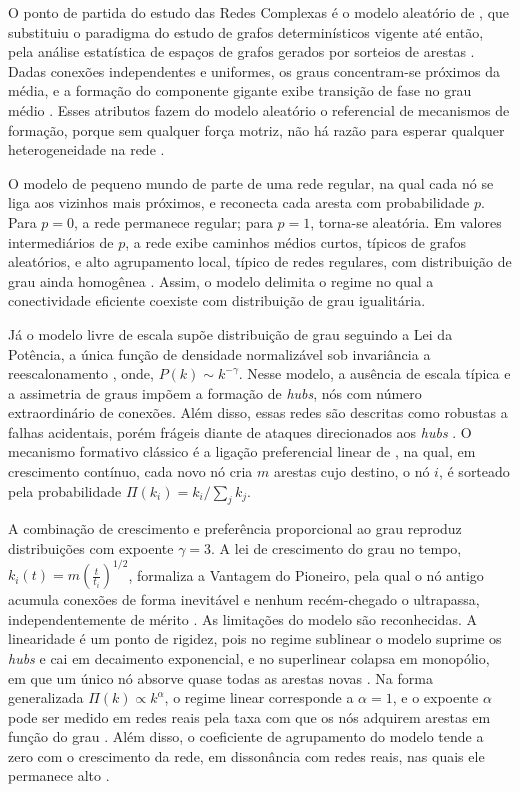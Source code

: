 \documentclass[12pt,oneside,a4paper,brazil,sumario=tradicional]{abntex2}
\begin{document}
O ponto de partida do estudo das Redes Complexas é o modelo aleatório de \textcite{erdos1959}, que substituiu o paradigma do estudo de grafos determinísticos vigente até então, pela análise estatística de espaços de grafos gerados por sorteios de arestas \parencite{barabasi2002, latora2017}. Dadas conexões independentes e uniformes, os graus concentram-se próximos da média, e a formação do componente gigante exibe transição de fase no grau médio \parencite{albert2002}. Esses atributos fazem do modelo aleatório o referencial de mecanismos de formação, porque sem qualquer força motriz, não há razão para esperar qualquer heterogeneidade na rede \parencite{newman2003}.

O modelo de pequeno mundo de \textcite{watts1998} parte de uma rede regular, na qual cada nó se liga aos vizinhos mais próximos, e reconecta cada aresta com probabilidade $p$. Para $p = 0$, a rede permanece regular; para $p = 1$, torna-se aleatória. Em valores intermediários de $p$, a rede exibe caminhos médios curtos, típicos de grafos aleatórios, e alto agrupamento local, típico de redes regulares, com distribuição de grau ainda homogênea \parencite{latora2017}. Assim, o modelo delimita o regime no qual a conectividade eficiente coexiste com distribuição de grau igualitária.

Já o modelo livre de escala supõe distribuição de grau seguindo a Lei da Potência, a única função de densidade normalizável sob invariância a reescalonamento \parencite{albert2002, newman2005}, onde, $P(k) \sim k^{-\gamma}$.
Nesse modelo, a ausência de escala típica e a assimetria de graus impõem a formação de \textit{hubs}, nós com número extraordinário de conexões. Além disso, essas redes são descritas como robustas a falhas acidentais, porém frágeis diante de ataques direcionados aos \textit{hubs} \parencite{newman2003, wang2003}. O mecanismo formativo clássico é a ligação preferencial linear de \textcite{barabasi1999}, na qual, em crescimento contínuo, cada novo nó cria $m$ arestas cujo destino, o nó $i$, é sorteado pela probabilidade $\Pi(k_{i}) = k_{i} / \sum_{j} k_{j}$.

A combinação de crescimento e preferência proporcional ao grau reproduz distribuições com expoente $\gamma = 3$. A lei de crescimento do grau no tempo, $k_{i}(t) = m \left(\frac{t}{t_{i}}\right)^{1/2}$, formaliza a Vantagem do Pioneiro, pela qual o nó antigo acumula conexões de forma inevitável e nenhum recém-chegado o ultrapassa, independentemente de mérito \parencite{barabasi1999b}. As limitações do modelo são reconhecidas. A linearidade é um ponto de rigidez, pois no regime sublinear o modelo suprime os \textit{hubs} e cai em decaimento exponencial, e no superlinear colapsa em monopólio, em que um único nó absorve quase todas as arestas novas \parencite{albert2002}. Na forma generalizada $\Pi(k) \propto k^{\alpha}$, o regime linear corresponde a $\alpha = 1$, e o expoente $\alpha$ pode ser medido em redes reais pela taxa com que os nós adquirem arestas em função do grau \parencite{newman2001, jeong2003}. Além disso, o coeficiente de agrupamento do modelo tende a zero com o crescimento da rede, em dissonância com redes reais, nas quais ele permanece alto \parencite{newman2003}.
\end{document}
